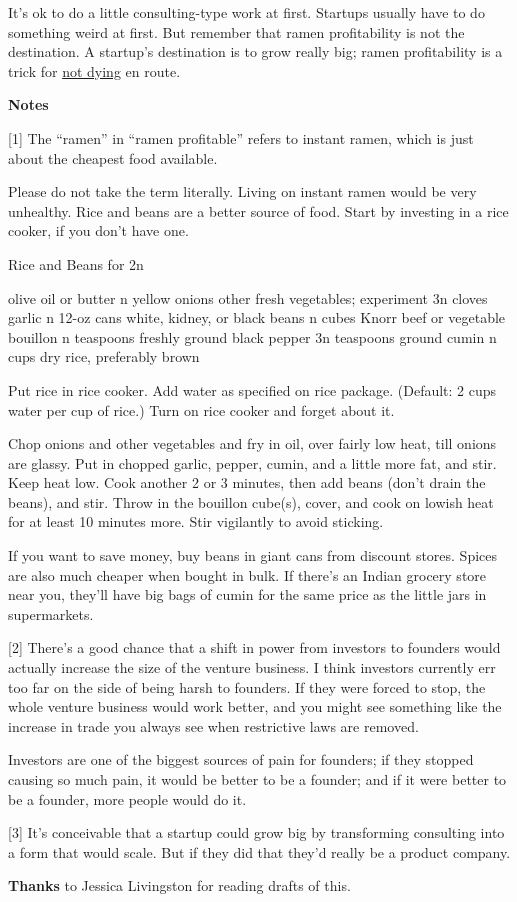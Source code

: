 It's ok to do a little consulting-type work at first. Startups usually
have to do something weird at first. But remember that ramen
profitability is not the destination. A startup's destination is to grow
really big; ramen profitability is a trick for \href{die.html}{not
dying} en route.

\textbf{Notes}

{[}1{]} The ``ramen'' in ``ramen profitable'' refers to instant ramen,
which is just about the cheapest food available.

Please do not take the term literally. Living on instant ramen would be
very unhealthy. Rice and beans are a better source of food. Start by
investing in a rice cooker, if you don't have one.

Rice and Beans for 2n

olive oil or butter n yellow onions other fresh vegetables; experiment
3n cloves garlic n 12-oz cans white, kidney, or black beans n cubes
Knorr beef or vegetable bouillon n teaspoons freshly ground black pepper
3n teaspoons ground cumin n cups dry rice, preferably brown

Put rice in rice cooker. Add water as specified on rice package.
(Default: 2 cups water per cup of rice.) Turn on rice cooker and forget
about it.

Chop onions and other vegetables and fry in oil, over fairly low heat,
till onions are glassy. Put in chopped garlic, pepper, cumin, and a
little more fat, and stir. Keep heat low. Cook another 2 or 3 minutes,
then add beans (don't drain the beans), and stir. Throw in the bouillon
cube(s), cover, and cook on lowish heat for at least 10 minutes more.
Stir vigilantly to avoid sticking.

If you want to save money, buy beans in giant cans from discount stores.
Spices are also much cheaper when bought in bulk. If there's an Indian
grocery store near you, they'll have big bags of cumin for the same
price as the little jars in supermarkets.

{[}2{]} There's a good chance that a shift in power from investors to
founders would actually increase the size of the venture business. I
think investors currently err too far on the side of being harsh to
founders. If they were forced to stop, the whole venture business would
work better, and you might see something like the increase in trade you
always see when restrictive laws are removed.

Investors are one of the biggest sources of pain for founders; if they
stopped causing so much pain, it would be better to be a founder; and if
it were better to be a founder, more people would do it.

{[}3{]} It's conceivable that a startup could grow big by transforming
consulting into a form that would scale. But if they did that they'd
really be a product company.

\textbf{Thanks} to Jessica Livingston for reading drafts of this.
